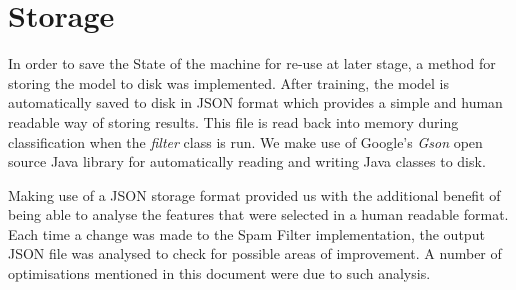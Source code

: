 \section{Storage}

In order to save the State of the machine for re-use at later stage, a method for storing the model to disk was implemented. After training, the model is automatically saved to disk in JSON format which provides a simple and human readable way of storing results. This file is read back into memory during classification when the \emph{filter} class is run. We make use of Google's \emph{Gson} open source Java library \cite{google:gson} for automatically reading and writing Java classes to disk. 

Making use of a JSON storage format provided us with the additional benefit of being able to analyse the features that were selected in a human readable format. Each time a change was made to the Spam Filter implementation, the output JSON file was analysed to check for possible areas of improvement. A number of optimisations mentioned in this document were due to such analysis.
